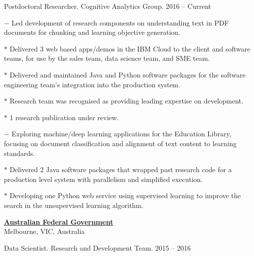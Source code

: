 \documentclass[10pt]{article}
\newcommand{\halfblankline}{\quad\vspace{-0.5\baselineskip}\pagebreak[3]}
\begin{document}
\begin{outerlist}
	\item Postdoctoral Researcher. Cognitive Analytics Group. \hfill {2016 -- Current}
	\begin{innerlist}
		\item[$-$] Led development of research components on understanding text in PDF documents for chunking and learning objective generation.
		\begin{innerlist}
			\item[$*$] Delivered 3 web based apps/demos in the IBM Cloud to the client and software teams, for use by the sales team, data science team, and SME team.
			\item[$*$] Delivered and maintained Java and Python software packages for the software engineering team's integration into the production system.
			\item[$*$] Research team was recognised as providing leading expertise on development.
			\item[$*$] 1 research publication under review.
		\end{innerlist}
		\item[$-$] Exploring machine/deep learning applications for the Education Library, focusing on document classification and alignment of text content to learning standards.
		\begin{innerlist}
			\item[$*$] Delivered 2 Java software packages that wrapped past research code for a production level system with parallelism and simplified execution.
			\item[$*$] Developing one Python web service using supervised learning to improve the search in the unsupervised learning algorithm.
		\end{innerlist}			
\end{innerlist}
\end{outerlist}

\halfblankline

\href{http://www.australia.gov.au/}{\textbf{Australian Federal Government}}\\
Melbourne, VIC, Australia

\begin{outerlist}
	\item Data Scientist. Research and Development Team. \hfill {2015 -- 2016}
\end{outerlist}
\end{document}
